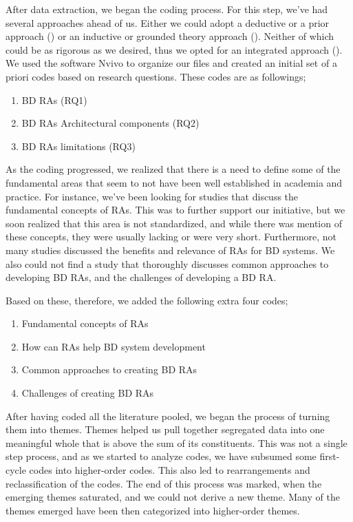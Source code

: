 \documentclass{ieeeaccess}
\begin{document}
After data extraction, we began the coding process. For this step, we've had several approaches ahead of us. Either we could adopt a deductive or a prior approach (\cite{miles1994qualitative}) or an inductive or grounded theory approach (\cite{corbin2014basics}). Neither of which could be as rigorous as we desired, thus we opted for an integrated approach (\cite{lofland1971analyzing}). We used the software Nvivo to organize our files and created an initial set of a priori codes based on research questions. These codes are as followings;

\begin{enumerate}
    \item BD RAs (RQ1)
    \item BD RAs Architectural components (RQ2)
    \item BD RAs limitations (RQ3)
\end{enumerate}

As the coding progressed, we realized that there is a need to define some of the fundamental areas that seem to not have been well established in academia and practice. For instance, we've been looking for studies that discuss the fundamental concepts of RAs. This was to further support our initiative, but we soon realized that this area is not standardized, and while there was mention of these concepts, they were usually lacking or were very short. Furthermore, not many studies discussed the benefits and relevance of RAs for BD systems. We also could not find a study that thoroughly discusses common approaches to developing BD RAs, and the challenges of developing a BD RA.

Based on these, therefore, we added the following extra four codes;
\begin{enumerate}
    \item Fundamental concepts of RAs
    \item How can RAs help BD system development
    \item Common approaches to creating BD RAs
    \item Challenges of creating BD RAs
\end{enumerate}

After having coded all the literature pooled, we began the process of turning them into themes. Themes helped us pull together segregated data into one meaningful whole that is above the sum of its constituents. This was not a single step process, and as we started to analyze codes, we have subsumed some first-cycle codes into higher-order codes. This also led to rearrangements and reclassification of the codes. The end of this process was marked, when the emerging themes saturated, and we could not derive a new theme. Many of the themes emerged have been then categorized into higher-order themes. 
\end{document}
